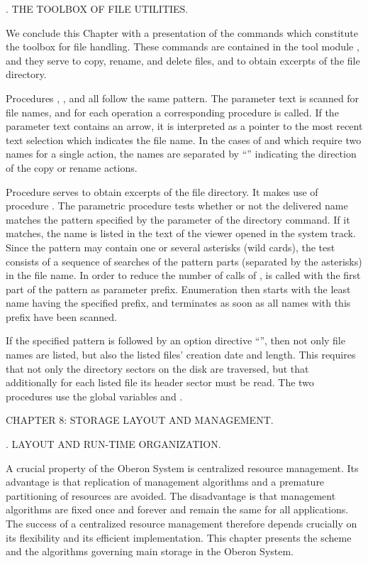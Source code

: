 . THE TOOLBOX OF FILE UTILITIES.

We conclude this Chapter with a presentation of the commands which constitute the toolbox for file handling. These commands are contained in the tool module , and they serve to copy, rename, and delete files, and to obtain excerpts of the file directory.

Procedures , , and  all follow the same pattern. The parameter text is scanned for file names, and for each operation a corresponding procedure is called. If the parameter text contains an arrow, it is interpreted as a pointer to the most recent text selection which indicates the file name. In the cases of  and  which require two names for a single action, the names are separated by ``\code{=>}'' indicating the direction of the copy or rename actions.

Procedure  serves to obtain excerpts of the file directory. It makes use of procedure . The parametric procedure  tests whether or not the delivered name matches the pattern specified by the parameter of the directory command. If it matches, the name is listed in the text of the viewer opened in the system track. Since the pattern may contain one or several asterisks (wild cards), the test consists of a sequence of searches of the pattern parts (separated by the asterisks) in the file name. In order to reduce the number of calls of ,  is called with the first part of the pattern as parameter prefix. Enumeration then starts with the least name having the specified prefix, and terminates as soon as all names with this prefix have been scanned.

If the specified pattern is followed by an option directive ``\code{!}'', then not only file names are listed, but also the listed files' creation date and length. This requires that not only the directory sectors on the disk are traversed, but that additionally for each listed file its header sector must be read. The two procedures use the global variables  and .

\beginchapter CHAPTER 8: STORAGE LAYOUT AND MANAGEMENT.

. LAYOUT AND RUN-TIME ORGANIZATION.

A crucial property of the Oberon System is centralized resource management. Its advantage is that replication of management algorithms and a premature partitioning of resources are avoided. The disadvantage is that management algorithms are fixed once and forever and remain the same for all applications. The success of a centralized resource management therefore depends crucially on its flexibility and its efficient implementation. This chapter presents the scheme and the algorithms governing main storage in the Oberon System.

